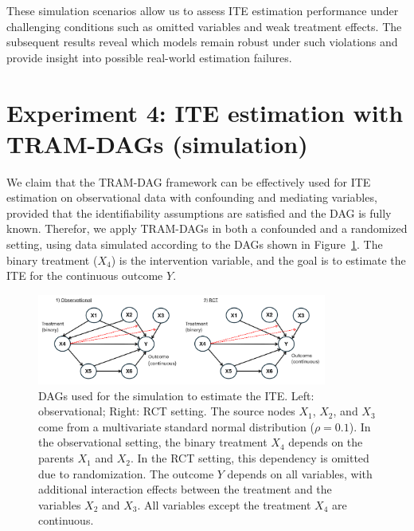 These simulation scenarios allow us to assess ITE estimation performance under challenging conditions such as omitted variables and weak treatment effects. The subsequent results reveal which models remain robust under such violations and provide insight into possible real-world estimation failures.











\section{Experiment 4: ITE estimation with TRAM-DAGs (simulation)} \label{sec:methods_experiment4}


We claim that the TRAM-DAG framework can be effectively used for ITE estimation on observational data with confounding and mediating variables, provided that the identifiability assumptions are satisfied and the DAG is fully known. Therefor, we apply TRAM-DAGs in both a confounded and a randomized setting, using data simulated according to the DAGs shown in Figure~\ref{fig:ite_dag_observational}. The binary treatment ($X_4$) is the intervention variable, and the goal is to estimate the ITE for the continuous outcome $Y$.


\begin{figure}[H]
\centering
\includegraphics[width=0.85\textwidth]{img/exp4_dags.png}
\caption{DAGs used for the simulation to estimate the ITE. Left: observational; Right: RCT setting. The source nodes $X_1$, $X_2$, and $X_3$ come from a multivariate standard normal distribution ($\rho=0.1$). In the observational setting, the binary treatment $X_4$ depends on the parents $X_1$ and $X_2$. In the RCT setting, this dependency is omitted due to randomization. The outcome $Y$ depends on all variables, with additional interaction effects between the treatment and the variables $X_2$ and $X_3$. All variables except the treatment $X_4$ are continuous.}
\label{fig:ite_dag_observational}
\end{figure}

